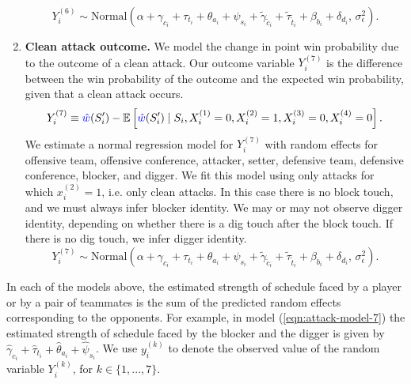\documentclass[USenglish]{article}
\theoremstyle{dgthm}
\theoremstyle{dgdef}
\begin{document}
\begin{enumerate}
\begin{equation}
            Y_i^{(6)} \sim \mbox{Normal}\left(
                \alpha + \gamma_{c_i} + \tau_{t_i} + \theta_{a_i} + \psi_{s_i} + \tilde\gamma_{\tilde c_i} + \tilde\tau_{\tilde t_i} + \beta_{b_i} + \delta_{d_i},\,
                \sigma^2_\epsilon
            \right).
        \end{equation}
    \item
        {\bf Clean attack outcome.} We model the change in point win probability due to the outcome of a clean attack. Our outcome variable $Y_i^{(7)}$ is the difference between the win probability of the outcome and the expected win probability, given that a clean attack occurs.
        \begin{equation*}
            Y_i^{(7)} \equiv \textcolor{blue}{\hat w}(S'_i) - \mathbb{E}\left[\textcolor{blue}{\hat w}(S'_i) \mid S_i, X_i^{(1)} = 0, X_i^{(2)} = 1, X_i^{(3)} = 0, X_i^{(4)} = 0\right].
        \end{equation*}
        We estimate a normal regression model for $Y_i^{(7)}$ with random effects for offensive team, offensive conference, attacker, setter, defensive team, defensive conference, blocker, and digger. We fit this model using only attacks for which $x_i^{(2)} = 1$, i.e. only clean attacks. In this case there is no block touch, and we must always infer blocker identity. We may or may not observe digger identity, depending on whether there is a dig touch after the block touch. If there is no dig touch, we infer digger identity.
        \begin{equation}
        \label{eqn:attack-model-7}
            Y_i^{(7)} \sim \mbox{Normal}\left(
                \alpha + \gamma_{c_i} + \tau_{t_i} + \theta_{a_i} + \psi_{s_i} + \tilde\gamma_{\tilde c_i} + \tilde\tau_{\tilde t_i} + \beta_{b_i} + \delta_{d_i},\,
                \sigma^2_\epsilon
            \right).
        \end{equation}
\end{enumerate}

In each of the models above, the estimated strength of schedule faced by a player or by a pair of teammates is the sum of the predicted random effects corresponding to the opponents. For example, in model (\ref{eqn:attack-model-7}) the estimated strength of schedule faced by the blocker and the digger is given by $\hat\gamma_{c_i} + \hat\tau_{t_i} + \hat\theta_{a_i} + \hat\psi_{s_i}$. We use $y_i^{(k)}$ to denote the observed value of the random variable $Y_i^{(k)}$, for $k \in \{1, ..., 7\}$.
\end{document}
